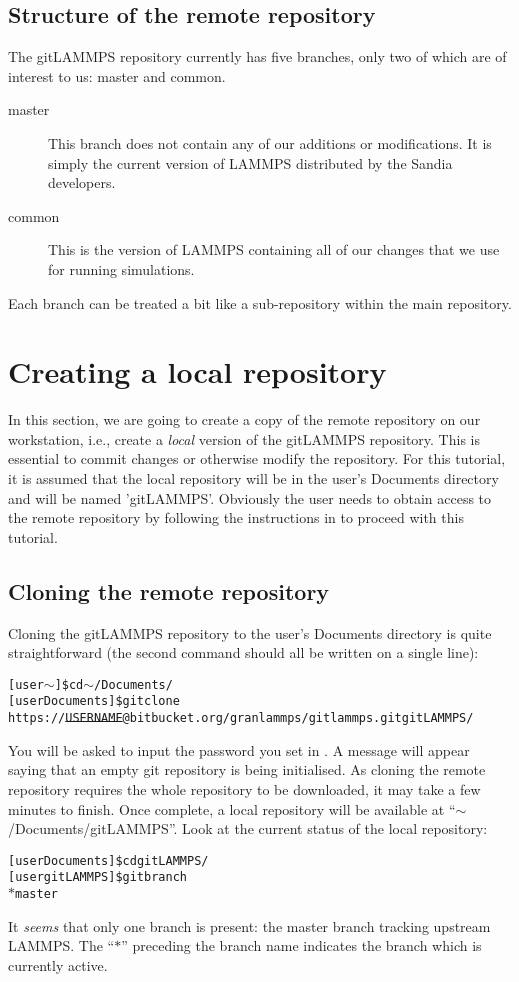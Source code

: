 \documentclass[a4paper,oneside,11pt]{article}
\begin{document}
\subsection{Structure of the remote repository}\label{ssec:srr}
The gitLAMMPS repository currently has five branches, only two of which are of interest to us: master and common.
\begin{description}
  \item[master] This branch does not contain any of our additions or modifications. It is simply the current version of LAMMPS distributed by the Sandia developers.
  \item[common] This is the version of LAMMPS containing all of our changes that we use for running simulations.
\end{description}
Each branch can be treated a bit like a sub-repository within the main repository.

\section{Creating a local repository}\label{sec:clr}
In this section, we are going to create a copy of the remote repository on our workstation, i.e., create a \emph{local} version of the gitLAMMPS repository. This is essential to commit changes or otherwise modify the repository. For this tutorial, it is assumed that the local repository will be in the user's Documents directory and will be named 'gitLAMMPS'. Obviously the user needs to obtain access to the remote repository by following the instructions in  to proceed with this tutorial.

\subsection{Cloning the remote repository}\label{ssec:crr}
Cloning the gitLAMMPS repository to the user's Documents directory is quite straightforward (the second command should all be written on a single line):
\begin{alltt}
[user \(\sim\)]\$ cd \(\sim\)/Documents/
[user Documents]\$ git clone 
  \hspace{5em} https://\sout{USERNAME}@bitbucket.org/granlammps/gitlammps.git gitLAMMPS/
\end{alltt}
You will be asked to input the password you set in . A message will appear saying that an empty git repository is being initialised. As cloning the remote repository requires the whole repository to be downloaded, it may take a few minutes to finish. Once complete, a local repository will be available at ``$\sim$\slash Documents\slash gitLAMMPS''. Look at the current status of the local repository:
\begin{alltt}
[user Documents]\$ cd gitLAMMPS/
[user gitLAMMPS]\$ git branch
\(\ast\) master
\end{alltt}
It \emph{seems} that only one branch is present: the master branch tracking upstream LAMMPS. The ``$\ast$'' preceding the branch name indicates the branch which is currently active. 
\end{document}
